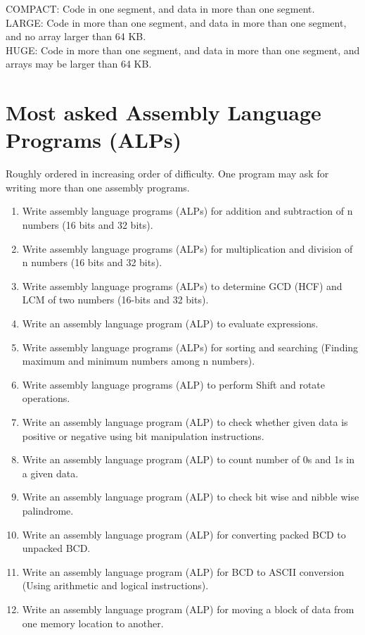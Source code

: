 \documentclass[12pt, a4paper]{scrartcl}
\begin{document}
	COMPACT: Code in one segment, and data in more than one segment.\\
	
	LARGE: Code in more than one segment, and data in more than one segment, and no array 
	larger than 64 KB.\\
	
	HUGE: Code in more than one segment, and data in more than one segment, and arrays may be larger than 64 KB.
	
\section{Most asked Assembly Language Programs (ALPs)} Roughly ordered in increasing order of difficulty. One program may ask for writing more than one assembly programs.
	\begin{enumerate}
		\item Write assembly language programs (ALPs) for addition and subtraction of n numbers (16 bits and 32 bits).
		\item Write assembly language programs (ALPs) for multiplication and division of n numbers (16 bits and 32 bits). 
		\item Write assembly language programs (ALPs) to determine GCD (HCF) and LCM of two numbers (16-bits and 32 bits). 
		\item Write an assembly language program (ALP) to evaluate expressions. 
		\item Write assembly language programs (ALPs) for sorting and searching (Finding maximum and minimum numbers among n numbers). 
		\item Write assembly language programs (ALP) to perform Shift and rotate operations. 
		\item Write an assembly language program (ALP) to check whether given data is positive or negative using bit manipulation instructions.
		\item Write an assembly language program (ALP) to count number of 0s and 1s in a given data.
		\item Write an assembly language program (ALP) to check bit wise and nibble wise palindrome.
		\item Write an assembly language program (ALP) for converting packed BCD to unpacked BCD. 
		\item Write an assembly language program (ALP) for BCD to ASCII conversion (Using arithmetic and logical instructions).  
		\item Write an assembly language program (ALP) for moving a block of data from one memory location to another.

\end{enumerate}
\end{document}
